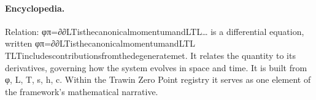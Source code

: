 \paragraph{Encyclopedia.}
Relation: φπ=∂∂LTisthecanonicalmomentumandLTL… is a differential equation, written φπ=∂∂LTisthecanonicalmomentumandLTL TLTincludescontributionsfromthedegeneratemet. It relates the quantity to its derivatives, governing how the system evolves in space and time. It is built from φ, L, T, s, h, c. Within the Trawin Zero Point registry it serves as one element of the framework's mathematical narrative.
